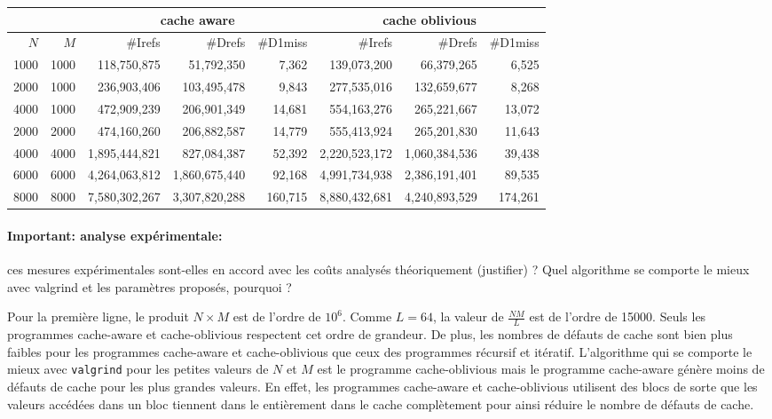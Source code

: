 \documentclass[10pt,a4paper]{article}
\begin{document}
\begin{center}
    {\footnotesize
    \begin{tabular}{|r|r||r|r|r||r|r|r||}
    \hline
     \multicolumn{2}{|c||}{ } 
    & \multicolumn{3}{c||}{cache aware}
    & \multicolumn{3}{c||}{cache oblivious}
    \\ \hline
    $N$ & $M$ 
    & \#Irefs & \#Drefs & \#D1miss %
    & \#Irefs & \#Drefs & \#D1miss %
    \\ \hline
    \hline
    1000 & 1000 
    & 118,750,875 & 51,792,350 & 7,362  %
    & 139,073,200 & 66,379,265 & 6,525  %
    \\ \hline
    2000 & 1000 
    & 236,903,406 & 103,495,478 & 9,843  %
    & 277,535,016 & 132,659,677 & 8,268  %
    \\ \hline
    4000 & 1000 
    & 472,909,239 & 206,901,349 & 14,681  %
    & 554,163,276 & 265,221,667 & 13,072  %
    \\ \hline
    2000 & 2000 
    & 474,160,260 & 206,882,587 & 14,779  %
    & 555,413,924 & 265,201,830 & 11,643  %
    \\ \hline
    4000 & 4000 
    & 1,895,444,821 & 827,084,387 & 52,392  %
    & 2,220,523,172 & 1,060,384,536 & 39,438  %
    \\ \hline
    6000 & 6000 
    & 4,264,063,812 & 1,860,675,440 & 92,168  %
    & 4,991,734,938 & 2,386,191,401 & 89,535  %
    \\ \hline
    8000 & 8000 
    & 7,580,302,267 & 3,307,820,288 & 160,715  %
    & 8,880,432,681 & 4,240,893,529 & 174,261 %
    \\ \hline
    \hline
    \end{tabular}
    }
\end{center}

\paragraph{Important: analyse expérimentale:}
ces mesures expérimentales sont-elles en accord avec les coûts analysés théoriquement (justifier) ? 
Quel algorithme se comporte le mieux avec valgrind et 
les paramètres proposés, pourquoi ?

\medskip

Pour la première ligne, le produit $N\times M$ est de l'ordre de $10^6$. Comme $L = 64$, la valeur de $\frac{NM}{L}$ est de l'ordre de 15000. Seuls les programmes cache-aware et cache-oblivious respectent cet ordre de grandeur. De plus, les nombres de défauts de cache sont bien plus faibles pour les programmes cache-aware et cache-oblivious que ceux des programmes récursif et itératif. L'algorithme qui se comporte le mieux avec \texttt{valgrind} pour les petites valeurs de $N$ et $M$ est le programme cache-oblivious mais le programme cache-aware génère moins de défauts de cache pour les plus grandes valeurs. En effet, les programmes cache-aware et cache-oblivious utilisent des blocs de sorte que les valeurs accédées dans un bloc tiennent dans le entièrement dans le cache complètement pour ainsi réduire le nombre de défauts de cache.
\end{document}

